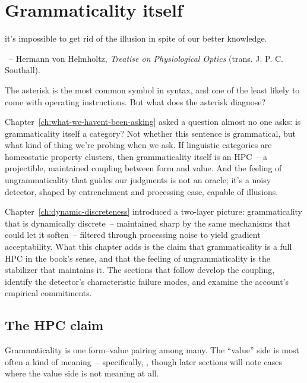 \chapter{Grammaticality itself}
\label{ch:grammaticality-itself}
\epigraph{it's impossible to get rid of the illusion in spite of our better knowledge.}{~-- Hermann von Helmholtz, \textit{Treatise on Physiological Optics} (trans. J. P. C. Southall).}

The asterisk is the most common symbol in syntax, and one of the least likely to come with operating instructions. But what does the asterisk diagnose?

Chapter~\ref{ch:what-we-havent-been-asking} asked a question almost no one asks: is grammaticality itself a category? Not whether this sentence is grammatical, but what kind of thing we're probing when we ask. If linguistic categories are homeostatic property clusters, then grammaticality itself is an HPC~-- a projectible, maintained coupling between form and value. And the feeling of ungrammaticality that guides our judgments is not an oracle; it's a noisy detector, shaped by entrenchment and processing ease, capable of illusions.

Chapter~\ref{ch:dynamic-discreteness} introduced a two-layer picture: grammaticality that is dynamically discrete~-- maintained sharp by the same mechanisms that could let it soften~-- filtered through processing noise to yield gradient acceptability. What this chapter adds is the claim that grammaticality is a full HPC in the book's sense, and that the feeling of ungrammaticality is the stabilizer that maintains it. The sections that follow develop the coupling, identify the detector's characteristic failure modes, and examine the account's empirical commitments.


\section{The HPC claim}
\label{sec:15:hpc-claim}

Grammaticality is one form--value pairing among many. The \enquote{value} side is most often a kind of meaning~-- specifically, , though later sections will note cases where the value side is not meaning at all.

